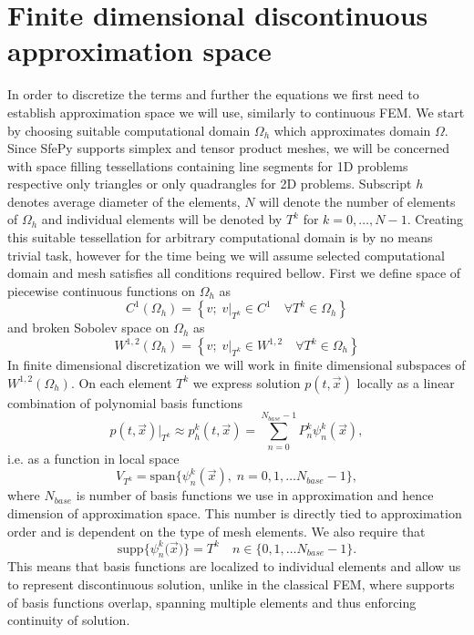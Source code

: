 \section{Finite dimensional discontinuous approximation space}
In order to discretize the terms and further the equations we first need to 
establish approximation space we will use, similarly to continuous FEM. We 
start by choosing suitable computational domain $\Omega_h$ which approximates 
domain $\Omega$. Since SfePy supports simplex and tensor product meshes, we 
will be concerned with space filling tessellations containing line segments 
for 1D problems respective only triangles or only quadrangles for 2D 
problems. Subscript $h$ denotes average diameter of the elements, 
$N$ will denote the number of elements of $\Omega_h$ and individual elements 
will be denoted by $T^k$ for $k=0, \ldots, N - 1$. Creating this suitable 
tessellation for arbitrary computational domain is by no means trivial task, 
however for the time being we will assume selected computational domain and 
mesh satisfies all conditions required bellow. First we define space of 
piecewise continuous functions  on $\Omega_h$ as 
\begin{equation}
    C^1(\Omega_h) =  \left\{v;\; v\vert_{T^k} \in C^1 \quad \forall T^k \in 
    \Omega_h \right\}
\end{equation}
and broken Sobolev space on $\Omega_h$ as
\begin{equation}\label{eq:sobh}
    W^{1, 2}(\Omega_h) = \left\{v;\; v\vert_{T^k} \in W^{1, 2}\quad \forall T^k 
    \in \Omega_h \right\}
\end{equation}
In finite dimensional discretization we will work in finite dimensional 
subspaces of $W^{1, 2}(\Omega_h)$. On each element $T^k$ we express 
solution $p(t, \vec{x})$ locally as a linear combination of polynomial basis functions
\begin{equation}
\label{eq:el_lin_comb}
    p(t, \vec{x})|_{T^k} \approx p_h^k(t, \vec{x}) = \sum\limits_{n=0}^{N_{base} - 1} 
    P_n^k\psi^k_n(\vec{x}),
\end{equation}
i.e. as a function in local space
\begin{equation}
    V_{T^k} = \text{span}\big\{ \psi_n^k(\vec{x}), \; n = 0,1, \dots  
    N_{base}-1\big\},
\end{equation}
where $N_{base}$ is number of basis functions we use in approximation and hence 
dimension of approximation space. This number is directly tied to approximation 
order and is dependent on the type of mesh elements. We also require that
\begin{equation}
    \text{supp}\big\{\psi_n^k(\vec{x}\big)\} = T^k \quad n \in \{0,1, 
    \dots  N_{base}-1\}.
\end{equation}
This means that basis functions are localized to individual elements and allow 
us to represent discontinuous solution, unlike in the classical FEM, where 
supports of basis functions overlap, spanning multiple elements and  thus 
enforcing continuity of solution.

